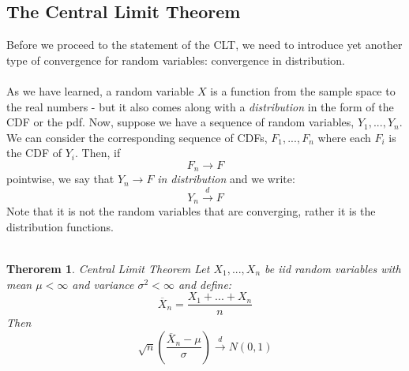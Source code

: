 \documentclass[12pt]{article} %
\newtheorem{thm}{Therorem}
\begin{document}
\subsection{The Central Limit Theorem}
Before we proceed to the statement of the CLT, we need to introduce yet another type of convergence for random variables: convergence in distribution.\\\\
As we have learned, a random variable $X$ is a function from the sample space to the real numbers - but it also comes along with a \emph{distribution} in the form of the CDF or the pdf. Now, suppose we have a sequence of random variables, $Y_1,...,Y_n$. We can consider the corresponding sequence of CDFs, $F_1,...,F_n$ where each $F_i$ is the CDF of $Y_i$. Then, if
$$F_n\rightarrow F$$
pointwise, we say that $Y_n\rightarrow F$ \emph{in distribution} and we write:
$$Y_n\xrightarrow{d} F$$
Note that it is not the random variables that are converging, rather it is the distribution functions.\\\\
\begin{thm}{Central Limit Theorem}
Let $X_1,...,X_n$ be iid random variables with mean $\mu<\infty$ and variance $\sigma^2<\infty$ and define:
$$\overline{X}_n = \frac{X_1+...+X_n}{n}$$
Then 
$$\sqrt{n}\left(\frac{\overline{X}_n-\mu}{\sigma}\right)\xrightarrow{d} N(0,1)$$
\end{thm}
\end{document}

